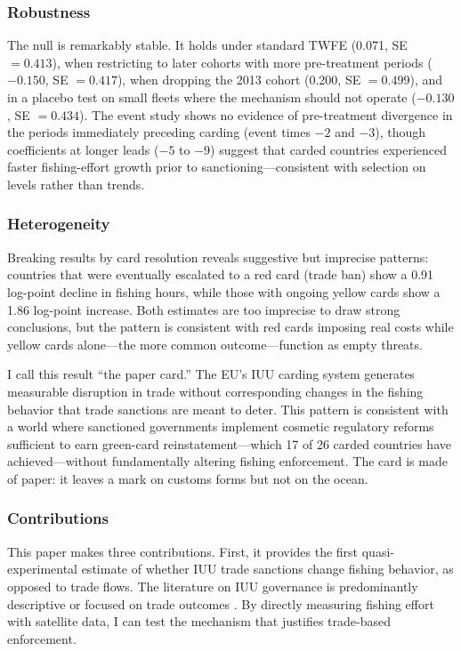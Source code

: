 \documentclass[12pt]{article}
\begin{document}
\subsubsection*{Robustness} The null is remarkably stable. It holds under standard TWFE (0.071, SE $= 0.413$), when restricting to later cohorts with more pre-treatment periods ($-0.150$, SE $= 0.417$), when dropping the 2013 cohort (0.200, SE $= 0.499$), and in a placebo test on small fleets where the mechanism should not operate ($-0.130$, SE $= 0.434$). The event study shows no evidence of pre-treatment divergence in the periods immediately preceding carding (event times $-2$ and $-3$), though coefficients at longer leads ($-5$ to $-9$) suggest that carded countries experienced faster fishing-effort growth prior to sanctioning---consistent with selection on levels rather than trends.

\subsubsection*{Heterogeneity} Breaking results by card resolution reveals suggestive but imprecise patterns: countries that were eventually escalated to a red card (trade ban) show a 0.91 log-point decline in fishing hours, while those with ongoing yellow cards show a 1.86 log-point increase. Both estimates are too imprecise to draw strong conclusions, but the pattern is consistent with red cards imposing real costs while yellow cards alone---the more common outcome---function as empty threats.

I call this result ``the paper card.'' The EU's IUU carding system generates measurable disruption in trade \citep{vatsov2023trade} without corresponding changes in the fishing behavior that trade sanctions are meant to deter. This pattern is consistent with a world where sanctioned governments implement cosmetic regulatory reforms sufficient to earn green-card reinstatement---which 17 of 26 carded countries have achieved---without fundamentally altering fishing enforcement. The card is made of paper: it leaves a mark on customs forms but not on the ocean.

\subsubsection*{Contributions} This paper makes three contributions. First, it provides the first quasi-experimental estimate of whether IUU trade sanctions change fishing behavior, as opposed to trade flows. The literature on IUU governance is predominantly descriptive \citep{fernandes2011does, agnew2009estimating} or focused on trade outcomes \citep{vatsov2023trade}. By directly measuring fishing effort with satellite data, I can test the mechanism that justifies trade-based enforcement.
\end{document}
